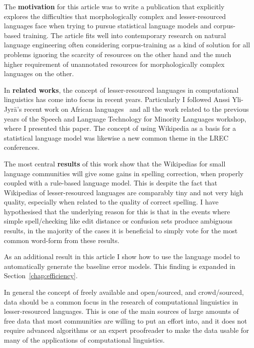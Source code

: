\documentclass[officiallayout]{unihelcompling}
\begin{document}
The \textbf{motivation} for this article was to write a publication that
explicitly explores the difficulties that morphologically complex and
lesser-resourced languages face when trying to pursue statistical language
models and corpus-based training. The article fits well into contemporary
research on natural language engineering often considering corpus-training as a
kind of solution for all problems ignoring the scarcity of resources on the
other hand and the much higher requirement of unannotated resources for
morphologically complex languages on the other.

In \textbf{related works}, the concept of lesser-resourced languages in
computational linguistics has come into focus in recent years. Particularly I
followed Anssi Yli-Jyrä's recent work on African
languages~\citep{yli2005toward} and all the work related to the previous years
of the Speech and Language Technology for Minority Languages workshop, where I
presented this paper.  The concept of using Wikipedia as a basis for a
statistical language model was likewise a new common theme in the LREC
conferences.

The most central \textbf{results} of this work show that the Wikipedias for
small language communities will give some gains in spelling correction, when
properly coupled with a rule-based language model. This is despite the fact
that Wikipedias of lesser-resourced languages are comparably tiny and not very
high quality, especially when related to the quality of correct spelling.  I
have hypothesised that the underlying reason for this is that in the events
where simple spell\-/checking like edit distance or confusion sets produce
ambiguous results, in the majority of the cases it is beneficial to simply vote
for the most common word-form from these results.

As an additional result in this article I show how to use the language model to
automatically generate the baseline error models. This finding is expanded in
Section~\ref{chap:efficiency}.

In general the concept of freely available and open\-/sourced, and
crowd\-/sourced, data should be a common focus in the research of computational
linguistics in lesser-resourced languages. This is one of the main sources of
large amounts of free data that most communities are willing to put an effort
into, and it does not require advanced algorithms or an expert proofreader to
make the data usable for many of the applications of computational linguistics.
\end{document}
